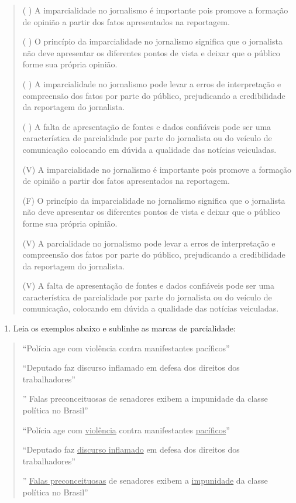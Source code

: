 \begin{quote}
( ) A imparcialidade no jornalismo é importante pois promove a formação
de opinião a partir dos fatos apresentados na reportagem.

( ) O princípio da imparcialidade no jornalismo significa que o
jornalista não deve apresentar os diferentes pontos de vista e deixar
que o público forme sua própria opinião.

( ) A imparcialidade no jornalismo pode levar a erros de interpretação e
compreensão dos fatos por parte do público, prejudicando a credibilidade
da reportagem do jornalista.

( ) A falta de apresentação de fontes e dados confiáveis pode ser uma
característica de parcialidade por parte do jornalista ou do veículo de
comunicação colocando em dúvida a qualidade das notícias veiculadas.

(V) A imparcialidade no jornalismo é importante pois promove a formação
de opinião a partir dos fatos apresentados na reportagem.

(F) O princípio da imparcialidade no jornalismo significa que o
jornalista não deve apresentar os diferentes pontos de vista e deixar
que o público forme sua própria opinião.

(V) A parcialidade no jornalismo pode levar a erros de interpretação e
compreensão dos fatos por parte do público, prejudicando a credibilidade
da reportagem do jornalista.

(V) A falta de apresentação de fontes e dados confiáveis pode ser uma
característica de parcialidade por parte do jornalista ou do veículo de
comunicação, colocando em dúvida a qualidade das notícias veiculadas.
\end{quote}

\begin{enumerate}
\def\labelenumi{\arabic{enumi})}
\setcounter{enumi}{6}
\tightlist
\item
  Leia os exemplos abaixo e sublinhe as marcas de parcialidade:
\end{enumerate}

\begin{quote}
``Polícia age com violência contra manifestantes pacíficos''

``Deputado faz discurso inflamado em defesa dos direitos dos
trabalhadores''

'' Falas preconceituosas de senadores exibem a impunidade da classe
política no Brasil''

``Polícia age com \uline{violência} contra manifestantes
\uline{pacíficos}''

``Deputado faz \uline{discurso inflamado} em defesa dos direitos dos
trabalhadores''

'' \uline{Falas preconceituosas} de senadores exibem a
\uline{impunidade} da classe política no Brasil''
\end{quote}

